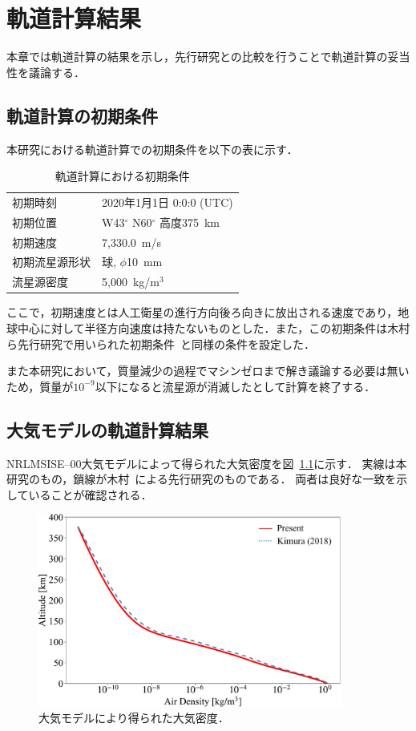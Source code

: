 \chapter{軌道計算結果}
\label{chap:trajectory}

本章では軌道計算の結果を示し，先行研究との比較を行うことで軌道計算の妥当性を議論する．

\section{軌道計算の初期条件}
本研究における軌道計算での初期条件を以下の表に示す．
\begin{table}[H]
    \centering
    \caption{軌道計算における初期条件}
    \begin{tabular}{ll}
    \hline\hline
        初期時刻 & 2020年1月1日 0:0:0 (UTC) \\
        初期位置 & W43$^\circ$ N60$^\circ$ 高度375~km \\
        初期速度 & 7,330.0~m/s \\
        初期流星源形状 & 球, $\phi$10~mm \\
        流星源密度 & 5,000~kg/m$^3$\\
    \hline\hline
    \end{tabular}
    \label{tab:initial-trajectory}
\end{table}
ここで，初期速度とは人工衛星の進行方向後ろ向きに放出される速度であり，地球中心に対して半径方向速度は持たないものとした．また，この初期条件は木村ら先行研究で用いられた初期条件~\cite{kimura2018ukaren}と同様の条件を設定した．

また本研究において，質量減少の過程でマシンゼロまで解き議論する必要は無いため，質量が$10^{-9}$以下になると流星源が消滅したとして計算を終了する．

\section{大気モデルの軌道計算結果}
NRLMSISE–00大気モデルによって得られた大気密度を図~\ref{fig:trajectory-rho}に示す．
実線は本研究のもの，鎖線が木村~\cite{kimura2018ukaren}による先行研究のものである．
両者は良好な一致を示していることが確認される．
\begin{figure}[p]
    \centering
    \includegraphics[width=10cm]{fig/trajectory/rho.pdf}
    \caption{大気モデルにより得られた大気密度．}
    \label{fig:trajectory-rho}
\end{figure}


